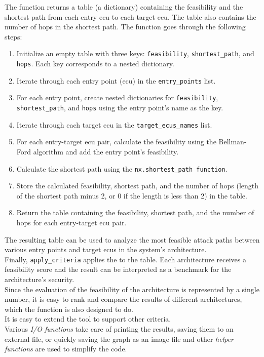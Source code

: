 The function returns a table (a dictionary) containing the feasibility and the shortest path from each entry \acrshort{ecu} to each target \acrshort{ecu}. 
The table also contains the number of hops in the shortest path.
The function goes through the following steps:

\begin{enumerate}
    \item Initialize an empty table with three keys: \texttt{feasibility}, \texttt{shortest\_path}, and \texttt{hops}. 
        Each key corresponds to a nested dictionary.
    \item Iterate through each entry point (\acrshort{ecu}) in the \texttt{entry\_points} list.
    \item For each entry point, create nested dictionaries for \texttt{feasibility}, \texttt{shortest\_path}, and \texttt{hops} using the entry point's name as the key.
    \item Iterate through each target \acrshort{ecu} in the \texttt{target\_ecus\_names} list.
    \item For each entry-target \acrshort{ecu} pair, calculate the feasibility using the Bellman-Ford algorithm and add the entry point's feasibility.
    \item Calculate the shortest path using the \texttt{nx.shortest\_path function}.
    \item Store the calculated feasibility, shortest path, and the number of hops (length of the shortest path minus 2, or 0 if the length is less than 2) in the table.
    \item Return the table containing the feasibility, shortest path, and the number of hops for each entry-target \acrshort{ecu} pair.
\end{enumerate}

The resulting table can be used to analyze the most feasible attack paths between various entry points and target \acrshort{ecu}s in the system's architecture.\\


Finally, \texttt{apply\_criteria} applies the  to the table.
Each architecture receives a feasibility score and the result can be interpreted as a benchmark for the architecture's security.\\
Since the evaluation of the feasibility of the architecture is represented by a single number, 
it is easy to rank and compare the results of different architectures, which the function is also designed to do.\\

It is easy to extend the tool to support other criteria.\\

Various \textit{I/O functions} take care of printing the results, saving them to an external file, or quickly saving the graph as an image file
and other \textit{helper functions} are used to simplify the code.
